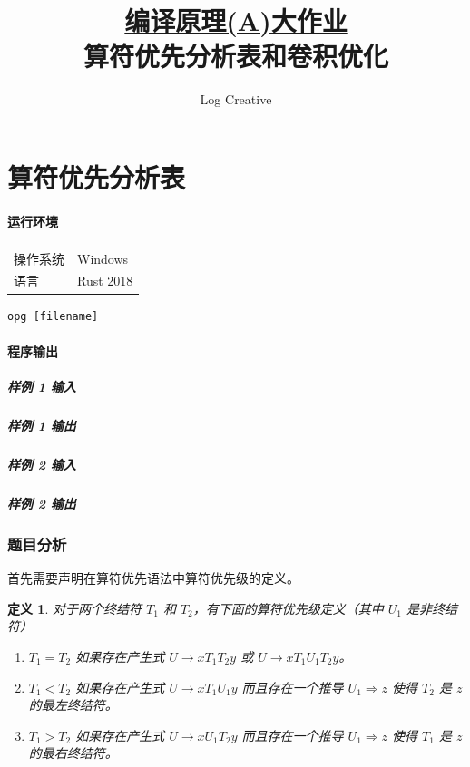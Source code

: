 \documentclass[UTF8]{ctexart}
\title{\normalsize\underline{编译原理(A)大作业}\\\Large 算符优先分析表和卷积优化}
\author{Log Creative}
\newtheorem{definition}{定义}
\begin{document}
    \maketitle 
    \tableofcontents
    \clearpage

\part{算符优先分析表}
\subsection*{运行环境}
\begin{tabular}{ll}
    操作系统 & Windows \\
    语言 & Rust 2018\cite{SteveKlabnik2019} \\
\end{tabular}
\vspace*{1em}
\begin{lstlisting}[frameround=fttt]
    opg [filename]
\end{lstlisting}
\subsection*{程序输出}
\subsubsection*{样例 1 输入}

\subsubsection*{样例 1 输出}

\subsubsection*{样例 2 输入}

\subsubsection*{样例 2 输出}


\section{题目分析}

首先需要声明在算符优先语法中算符优先级的定义\cite{Floyd1963}。
\begin{definition}\label{def:op}
    对于两个终结符 $T_1$ 和 $T_2$，有下面的算符优先级定义（其中 $U_1$ 是非终结符）
    \begin{enumerate}
        \item $T_1=T_2$ 如果存在产生式 $U\rightarrow xT_1T_2y$ 或 $U\rightarrow xT_1 U_1 T_2 y$。
        \item $T_1<T_2$ 如果存在产生式 $U\rightarrow xT_1U_1y$ 而且存在一个推导 $U_1\Rightarrow z$ 使得 $T_2$ 是 $z$ 的最左终结符。
        \item $T_1>T_2$ 如果存在产生式 $U\rightarrow xU_1T_2y$ 而且存在一个推导 $U_1\Rightarrow z$ 使得 $T_1$ 是 $z$ 的最右终结符。
    \end{enumerate}
\end{definition}
\end{document}
